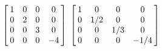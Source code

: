 {$\left[\hskip -3pt \begin{array}{cccc} 1&0&0&0\\  0&2&0&0
\\  0&0&3&0\\  0&0&0&-4
\end{array}\hskip -3pt \right] $ 
}
{$ \left[\hskip -3pt \begin{array}{cccc} 1&0&0&0\\  0&1/2&0&0
\\  0&0&1/3&0\\  0&0&0&-1/4
\end{array}\hskip -3pt \right]$}
